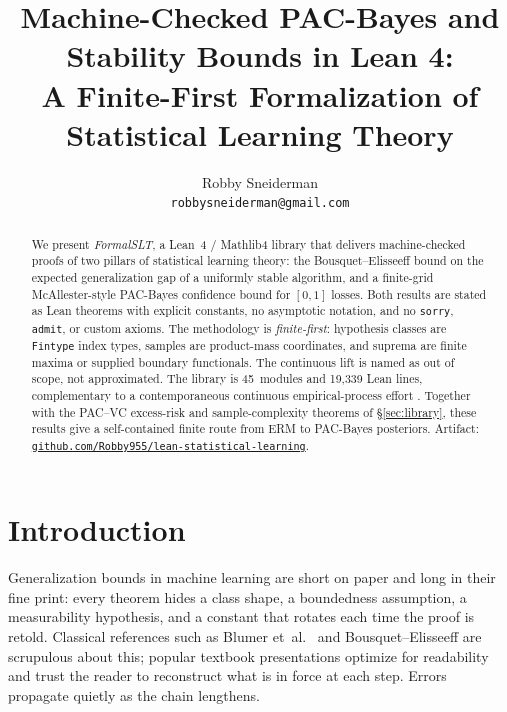 \documentclass[10pt,twocolumn,letterpaper]{article}
\title{\vspace{-3ex}\Large\bfseries Machine-Checked PAC-Bayes and Stability Bounds in Lean 4:\\
\large A Finite-First Formalization of Statistical Learning Theory}
\author{Robby Sneiderman \\ \small\texttt{robbysneiderman@gmail.com}}
\date{\vspace{-2ex}}
\begin{document}
\onecolumn
\maketitle
\vspace{-4ex}
\begin{abstract}
\noindent
We present \emph{FormalSLT}, a Lean~4 / Mathlib4 library that delivers
machine-checked proofs of two pillars of statistical learning theory:
the Bousquet--Elisseeff bound on the expected generalization gap of a
uniformly stable algorithm, and a finite-grid McAllester-style PAC-Bayes
confidence bound for $[0,1]$ losses. Both results are stated as Lean
theorems with explicit constants, no asymptotic notation, and no
\texttt{sorry}, \texttt{admit}, or custom axioms. The methodology is
\emph{finite-first}: hypothesis classes are \texttt{Fintype} index types,
samples are product-mass coordinates, and suprema are finite maxima or
supplied boundary functionals. The continuous lift is named as out of scope,
not approximated. The library is 45~modules and 19,339 Lean lines,
complementary to a contemporaneous continuous
empirical-process effort \cite{YuanheZ2026}. Together with the PAC--VC
excess-risk and sample-complexity theorems of \S\ref{sec:library}, these
results give a self-contained finite route from ERM to PAC-Bayes posteriors.
Artifact:
\href{https://github.com/Robby955/lean-statistical-learning}{\nolinkurl{github.com/Robby955/lean-statistical-learning}}.
\end{abstract}
\vspace{1ex}
\twocolumn

\section{Introduction}
\label{sec:intro}

Generalization bounds in machine learning are short on paper and long in
their fine print: every theorem hides a class shape, a boundedness
assumption, a measurability hypothesis, and a constant that rotates each
time the proof is retold. Classical references such as Blumer et~al.\
\cite{Blumer1989} and Bousquet--Elisseeff \cite{BousquetElisseeff2002}
are scrupulous about this; popular textbook presentations
\cite{ShalevShwartz2014, BoucheronLugosiMassart2013} optimize for
readability and trust the reader to reconstruct what is in force at each
step. Errors propagate quietly as the chain lengthens.
\end{document}
